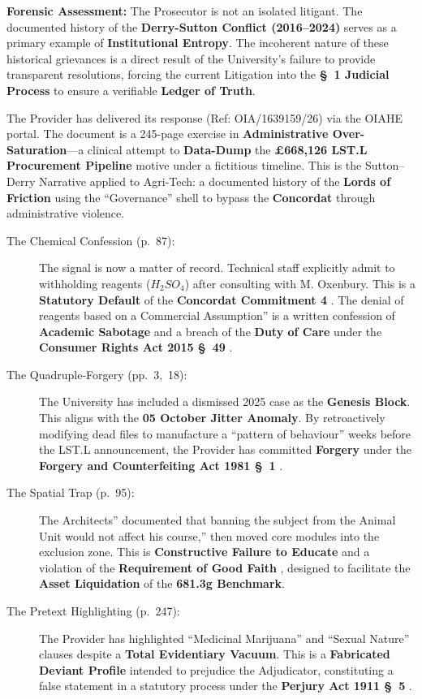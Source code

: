 \documentclass{EMBASSY}
\begin{document}
\textbf{Forensic Assessment:} The Prosecutor is not an isolated litigant. The documented history of the \textbf{Derry-Sutton Conflict (2016--2024)} serves as a primary example of \textbf{Institutional Entropy}. The incoherent nature of these historical grievances is a direct result of the University’s failure to provide transparent resolutions, forcing the current Litigation into the \textbf{\S~1 Judicial Process} \cite{MCA80} to ensure a verifiable \textbf{Ledger of Truth}.

The Provider has delivered its response (Ref: OIA/1639159/26) via the OIAHE portal. The document is a 245-page exercise in \textbf{Administrative Over-Saturation}---a clinical attempt to \textbf{Data-Dump} the \textbf{\pounds668,126 LST.L Procurement Pipeline} motive under a fictitious timeline. This is the Sutton--Derry Narrative applied to Agri-Tech: a documented history of the \textbf{Lords of Friction} using the ``Governance'' shell to bypass the \textbf{Concordat} \cite{Concordat25} through administrative violence.

\begin{description}
	\item[The Chemical Confession (p.~87):] The signal is now a matter of record. Technical staff explicitly admit to withholding reagents ($H_2SO_4$) after consulting with M. Oxenbury. This is a \textbf{Statutory Default} of the \textbf{Concordat Commitment 4} \cite{Concordat25}. The denial of reagents based on a Commercial Assumption'' is a written confession of \textbf{Academic Sabotage} and a breach of the \textbf{Duty of Care} under the \textbf{Consumer Rights Act 2015 \S~49} \cite{CRA15}.
	\item[The Quadruple-Forgery (pp.~3,~18):] The University has included a dismissed 2025 case as the \textbf{Genesis Block}. This aligns with the \textbf{05 October Jitter Anomaly}. By retroactively modifying dead files to manufacture a ``pattern of behaviour'' weeks before the LST.L announcement, the Provider has committed \textbf{Forgery} under the \textbf{Forgery and Counterfeiting Act 1981 \S~1} \cite{FCA81}.
	\item[The Spatial Trap (p.~95):] The Architects'' documented that banning the subject from the Animal Unit would not affect his course,'' then moved core modules into the exclusion zone. This is \textbf{Constructive Failure to Educate} and a violation of the \textbf{Requirement of Good Faith} \cite{CMA182}, designed to facilitate the \textbf{Asset Liquidation} of the \textbf{681.3g Benchmark}.
	\item[The Pretext Highlighting (p.~247):] The Provider has highlighted ``Medicinal Marijuana'' and ``Sexual Nature'' clauses despite a \textbf{Total Evidentiary Vacuum}. This is a \textbf{Fabricated Deviant Profile} intended to prejudice the Adjudicator, constituting a false statement in a statutory process under the \textbf{Perjury Act 1911 \S~5} \cite{PerjuryAct11}.
\end{description}
\end{document}
